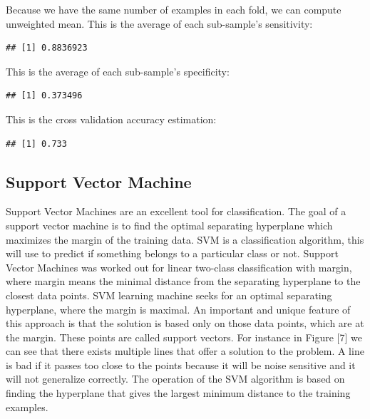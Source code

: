 \documentclass{article}\usepackage[]{graphicx}\usepackage[]{color}
\makeatletter
\newenvironment{kframe}{%
 \def\at@end@of@kframe{}%
 \ifinner\ifhmode%
  \def\at@end@of@kframe{\end{minipage}}%
  \begin{minipage}{\columnwidth}%
 \fi\fi%
 \def\FrameCommand##1{\hskip\@totalleftmargin \hskip-\fboxsep
 \colorbox{shadecolor}{##1}\hskip-\fboxsep
     \hskip-\linewidth \hskip-\@totalleftmargin \hskip\columnwidth}%
 \MakeFramed {\advance\hsize-\width
   \@totalleftmargin\z@ \linewidth\hsize
   \@setminipage}}%
 {\par\unskip\endMakeFramed%
 \at@end@of@kframe}
\newenvironment{knitrout}{}{} %
\makeatother
\begin{document}
Because we have the same number of examples in each fold, we can compute unweighted mean. This is the average of each sub-sample's sensitivity:
\begin{knitrout}
\color{fgcolor}\begin{kframe}
\begin{verbatim}
## [1] 0.8836923
\end{verbatim}
\end{kframe}
\end{knitrout}
This is the average of each sub-sample's specificity:
\begin{knitrout}
\color{fgcolor}\begin{kframe}
\begin{verbatim}
## [1] 0.373496
\end{verbatim}
\end{kframe}
\end{knitrout}
This is the cross validation accuracy estimation:
\begin{knitrout}
\color{fgcolor}\begin{kframe}
\begin{verbatim}
## [1] 0.733
\end{verbatim}
\end{kframe}
\end{knitrout}



\subsection{Support Vector Machine}\hspace{0.9cm} Support Vector Machines are an excellent tool for classification. The goal of a support vector machine is to find  the optimal separating hyperplane which maximizes the margin of the training data. SVM is a classification algorithm, this will use to predict if something belongs to a particular class or not. Support Vector Machines was worked out for linear two-class classification with margin, where margin means the minimal distance from the separating hyperplane to the closest data points. SVM learning machine seeks for an optimal separating hyperplane, where the margin is maximal. An important and unique feature of this approach is that the solution is based only on those data points, which are at the margin. These points are called support vectors. For instance in Figure [7] we can see that there exists multiple lines that offer a solution to the problem. A line is bad if it passes too close to the points because it will be noise sensitive and it will not generalize correctly. The operation of the SVM algorithm is based on finding the hyperplane that gives the largest minimum distance to the training examples.
\end{document}
